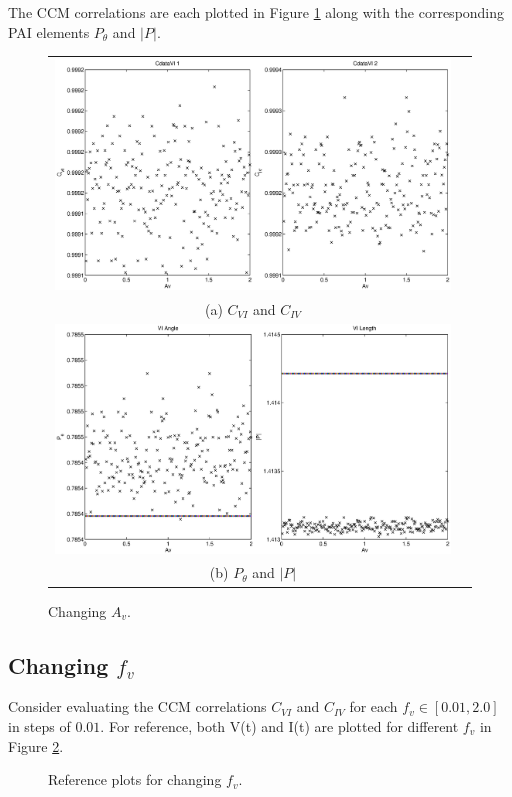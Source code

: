 \documentclass{article}
\begin{document}
The CCM correlations are each plotted in Figure \ref{fig:Av} along with the corresponding PAI elements $P_\theta$ and $|P|$.
\begin{figure}[H]
\begin{tabular}{cc}
\includegraphics[scale=0.5]{RLcirc_varyV_amp2.eps} \\
(a) $C_{VI}$ and $C_{IV}$ \\[6pt]
\includegraphics[scale=0.5]{RLcirc_varyV_amp.eps} \\
(b) $P_\theta$ and $|P|$ \\[6pt]
\end{tabular}
\caption{Changing $A_v$.}
\label{fig:Av}
\end{figure}

\subsection{Changing $f_v$}
Consider evaluating the CCM correlations $C_{VI}$ and $C_{IV}$ for each $f_v\in[0.01,2.0]$ in steps of $0.01$.  For reference, both V(t) and I(t) are plotted for different $f_v$ in Figure \ref{fig:fvref}.
\begin{figure}[H]
\caption{Reference plots for changing $f_v$.}
\label{fig:fvref}
\end{figure}
\end{document}
